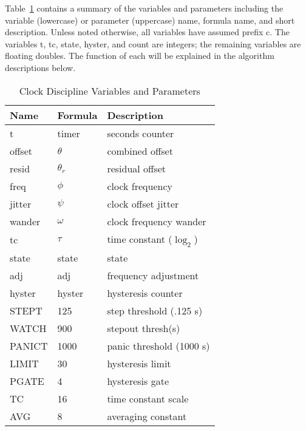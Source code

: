 Table~\ref{clock_discipline_variables_and_parameters} contains a summary of the variables and parameters
including the variable (lowercase) or parameter (uppercase) name,
formula name, and short description. Unless noted otherwise, all
variables have assumed prefix c. The variables t, tc, state, hyster,
and count are integers; the remaining variables are floating doubles.
The function of each will be explained in the algorithm descriptions
below.

\begin{table}[htb]
  \center
  \begin{tabular}{| l | l | l |}
    \hline
    Name   & Formula    & Description              \\
    \hline
    \hline
    t      & timer      & seconds counter          \\
    offset & $ \theta $      & combined offset          \\
    resid  & $ \theta_r $   & residual offset          \\
    freq   & $ \phi $        & clock frequency          \\
    jitter & $ \psi $        & clock offset jitter      \\
    wander & $ \omega $      & clock frequency wander   \\
    tc     & $ \tau $        & time constant ($ \log_2 $)     \\
    state  & state      & state                    \\
    adj    & adj        & frequency adjustment     \\
    hyster & hyster     & hysteresis counter       \\
    STEPT  & 125        & step threshold (.125 s)  \\
    WATCH  & 900        & stepout thresh(s)        \\
    PANICT & 1000       & panic threshold (1000 s) \\
    LIMIT  & 30         & hysteresis limit         \\
    PGATE  & 4          & hysteresis gate          \\
    TC     & 16         & time constant scale      \\
    AVG    & 8          & averaging constant       \\
    \hline
  \end{tabular}
  \caption{Clock Discipline Variables and Parameters}
  \label{clock_discipline_variables_and_parameters}
\end{table}

